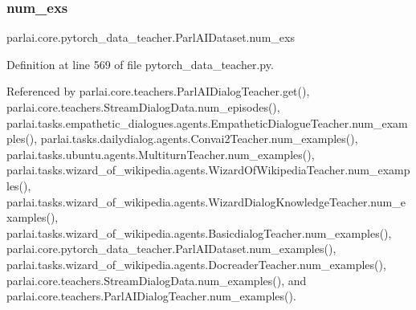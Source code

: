 \mbox{\label{classparlai_1_1core_1_1pytorch__data__teacher_1_1ParlAIDataset_abdd1801c6e081df8cdb22fcb207edb80}} 
\subsubsection{\texorpdfstring{num\+\_\+exs}{num\_exs}}
{\footnotesize\ttfamily parlai.\+core.\+pytorch\+\_\+data\+\_\+teacher.\+Parl\+A\+I\+Dataset.\+num\+\_\+exs}



Definition at line 569 of file pytorch\+\_\+data\+\_\+teacher.\+py.



Referenced by parlai.\+core.\+teachers.\+Parl\+A\+I\+Dialog\+Teacher.\+get(), parlai.\+core.\+teachers.\+Stream\+Dialog\+Data.\+num\+\_\+episodes(), parlai.\+tasks.\+empathetic\+\_\+dialogues.\+agents.\+Empathetic\+Dialogue\+Teacher.\+num\+\_\+examples(), parlai.\+tasks.\+dailydialog.\+agents.\+Convai2\+Teacher.\+num\+\_\+examples(), parlai.\+tasks.\+ubuntu.\+agents.\+Multiturn\+Teacher.\+num\+\_\+examples(), parlai.\+tasks.\+wizard\+\_\+of\+\_\+wikipedia.\+agents.\+Wizard\+Of\+Wikipedia\+Teacher.\+num\+\_\+examples(), parlai.\+tasks.\+wizard\+\_\+of\+\_\+wikipedia.\+agents.\+Wizard\+Dialog\+Knowledge\+Teacher.\+num\+\_\+examples(), parlai.\+tasks.\+wizard\+\_\+of\+\_\+wikipedia.\+agents.\+Basicdialog\+Teacher.\+num\+\_\+examples(), parlai.\+core.\+pytorch\+\_\+data\+\_\+teacher.\+Parl\+A\+I\+Dataset.\+num\+\_\+examples(), parlai.\+tasks.\+wizard\+\_\+of\+\_\+wikipedia.\+agents.\+Docreader\+Teacher.\+num\+\_\+examples(), parlai.\+core.\+teachers.\+Stream\+Dialog\+Data.\+num\+\_\+examples(), and parlai.\+core.\+teachers.\+Parl\+A\+I\+Dialog\+Teacher.\+num\+\_\+examples().

\mbox{\label{classparlai_1_1core_1_1pytorch__data__teacher_1_1ParlAIDataset_a5bf9f1b261c64e4ab37120ba6ed8b935}} 
